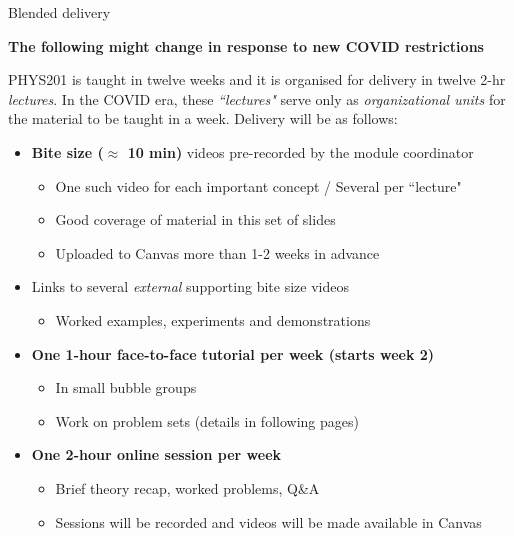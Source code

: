 %
%
%

\begin{frame}{Blended delivery}

{\bf \color{red} The following might change in response to new COVID restrictions}
\vspace{0.1cm}

{\small
PHYS201 is taught in twelve weeks and it is organised for delivery
in twelve 2-hr {\em lectures}.
In the COVID era, these {\em ``lectures"} serve only as {\em organizational units}
for the material to be taught in a week. Delivery will be as follows:

\begin{itemize}

\item {\bf Bite size ($\approx$ 10 min)} videos pre-recorded by the module coordinator
   \begin{itemize}
       \item One such video for each important concept / Several per ``lecture"
       \item Good coverage of material in this set of slides
       \item Uploaded to Canvas more than 1-2 weeks in advance
    \end{itemize}
\item Links to several {\em external} supporting bite size videos
   \begin{itemize}
       \item Worked examples, experiments and demonstrations
   \end{itemize}
\item {\bf One 1-hour face-to-face tutorial per week (starts week 2)}
   \begin{itemize}
      \item In small bubble groups
      \item Work on problem sets (details in following pages)
   \end{itemize}
\item {\bf One 2-hour online session per week}
   \begin{itemize}
       \item Brief theory recap, worked problems, Q\&A
       \item Sessions will be recorded and videos will be made available in Canvas
   \end{itemize}
\end{itemize}

}

\end{frame}

